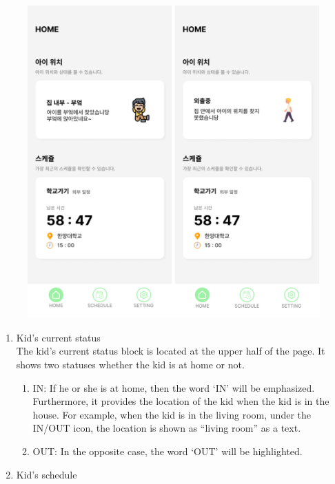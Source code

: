 \documentclass[conference]{IEEEtran}
\begin{document}
\begin{enumerate}[label=\arabic*.]
    \begin{figure}[H]\centering\includegraphics[scale=0.35]{images/main.png}\end{figure}  
    \begin{enumerate}[label=\alph*.]
        \item {\large{Kid's current status}} \\
        The kid’s current status block is located at the upper half of the page. It shows two statuses whether the kid is at home or not. \\
        \begin{enumerate}[label=\roman*.]
            \item {\large{IN: If he or she is at home, then the word ‘IN’ will be emphasized. Furthermore, it provides the location of the kid when the kid is in the house. For example, when the kid is in the living room, under the IN/OUT icon, the location is shown as “living room” as a text.}} \\
            \item {\large{OUT: In the opposite case, the word ‘OUT’ will be highlighted. }} \\
        \end{enumerate}
        \item {\large{Kid’s schedule}} \\

\end{enumerate}
\end{enumerate}
\end{document}
